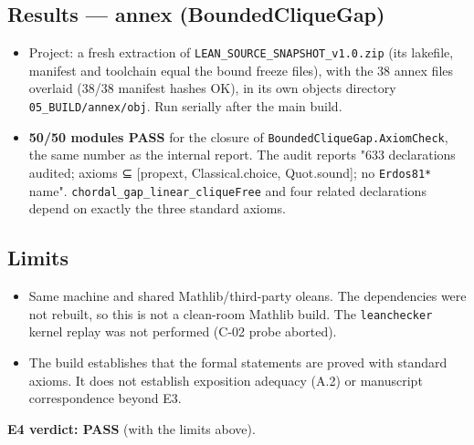 \documentclass[
]{article}
\providecommand{\tightlist}{%
  \setlength{\itemsep}{0pt}\setlength{\parskip}{0pt}}
\begin{document}
\subsection{Results --- annex
(BoundedCliqueGap)}\label{results--annex-boundedcliquegap}

\begin{itemize}
\tightlist
\item
  Project: a fresh extraction of
  \texttt{LEAN\_SOURCE\_SNAPSHOT\_v1.0.zip} (its lakefile, manifest and
  toolchain equal the bound freeze files), with the 38 annex files
  overlaid (38/38 manifest hashes OK), in its own objects directory
  \texttt{05\_BUILD/annex/obj}. Run serially after the main build.
\item
  \textbf{50/50 modules PASS} for the closure of
  \texttt{BoundedCliqueGap.AxiomCheck}, the same number as the internal
  report. The audit reports "633 declarations audited; axioms ⊆
  {[}propext, Classical.choice, Quot.sound{]}; no \texttt{Erdos81*}
  name". \texttt{chordal\_gap\_linear\_cliqueFree} and four related
  declarations depend on exactly the three standard axioms.
\end{itemize}

\subsection{Limits}\label{limits}

\begin{itemize}
\tightlist
\item
  Same machine and shared Mathlib/third-party oleans. The dependencies
  were not rebuilt, so this is not a clean-room Mathlib build. The
  \texttt{leanchecker} kernel replay was not performed (C-02 probe
  aborted).
\item
  The build establishes that the formal statements are proved with
  standard axioms. It does not establish exposition adequacy (A.2) or
  manuscript correspondence beyond E3.
\end{itemize}

\textbf{E4 verdict: PASS} (with the limits above).
\end{document}
